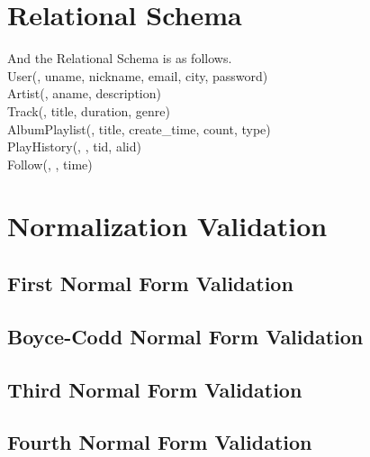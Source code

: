 \documentclass[letter, 12pt]{report}
\begin{document}
	\section{Relational Schema}
	And the Relational Schema is as follows.\\
	User(\underline{}, uname, nickname, email, city, password)\\
	Artist(\underline{}, aname, description)\\
	Track(\underline{}, title, duration, genre)\\
	AlbumPlaylist(\underline{}, title, create\_time, count, type)\\
	PlayHistory(\underline{}, \underline{}, tid, alid)\\
	Follow(\underline{}, \underline{}, time)\\
	
	
	\section{Normalization Validation}
	\subsection{First Normal Form Validation}
	\subsection{Boyce-Codd Normal Form Validation}
	\subsection{Third Normal Form Validation}
	\subsection{Fourth Normal Form Validation}
	
\end{document}
